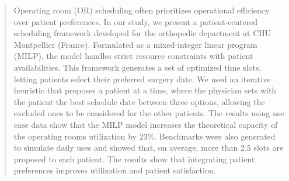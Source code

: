 
\begin{abstract}
Operating room (OR) scheduling often prioritizes operational efficiency over patient preferences. In our study, we present a patient-centered scheduling framework developed for the orthopedic department at CHU Montpellier (France). Formulated as a mixed-integer linear program (MILP), the model handles strict resource constraints with patient availabilities. This framework generates a set of optimized time slots, letting patients select their preferred surgery date. We used an iterative heuristic that proposes a patient at a time, where the physician sets with the patient the best schedule date between three options, allowing the excluded ones to be considered for the other patients. The results using use case data show that the MILP model increases the theoretical capacity of the operating rooms utilization by 23\%. Benchmarks were also generated to simulate daily uses and showed that, on average, more than 2.5 slots are proposed to each patient. The results show that integrating patient preferences improves utilization and patient satisfaction.

\end{abstract}
